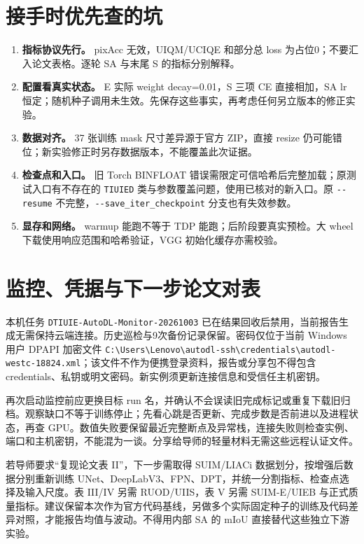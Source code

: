 \documentclass[UTF8,11pt,a4paper,fontset=windows]{ctexart}
\begin{document}
\section{接手时优先查的坑}

\begin{enumerate}
\item \textbf{指标协议先行。} pixAcc 无效，UIQM/UCIQE 和部分总 loss 为占位0；不要汇入论文表格。逐轮 SA 与末尾 S 的指标分别解释。
\item \textbf{配置看真实状态。} E 实际 weight decay=0.01，S 三项 CE 直接相加，SA lr 恒定；随机种子调用未生效。先保存这些事实，再考虑任何另立版本的修正实验。
\item \textbf{数据对齐。} 37 张训练 mask 尺寸差异源于官方 ZIP，直接 resize 仍可能错位；新实验修正时另存数据版本，不能覆盖此次证据。
\item \textbf{检查点和入口。} 旧 Torch BINFLOAT 错误需限定可信哈希后完整加载；原测试入口有不存在的 \texttt{TIUIED} 类与参数覆盖问题，使用已核对的新入口。原 \texttt{-\allowbreak{}-\allowbreak{}resume} 不完整，\texttt{-\allowbreak{}-\allowbreak{}save\_\allowbreak{}iter\_\allowbreak{}checkpoint} 分支也有失效参数。
\item \textbf{显存和网络。} warmup 能跑不等于 TDP 能跑；后阶段要真实预检。大 wheel 下载使用响应范围和哈希验证，VGG 初始化缓存亦需校验。
\end{enumerate}

\section{监控、凭据与下一步论文对表}

本机任务 \texttt{DTIUIE-\allowbreak{}AutoD\allowbreak{}L-\allowbreak{}Monitor-\allowbreak{}20\allowbreak{}261003} 已在结果回收后禁用，当前报告生成无需保持云端连接。历史巡检与9次备份记录保留。密码仅位于当前 Windows 用户 DPAPI 加密文件 \texttt{C:\allowbreak{}\textbackslash{}\allowbreak{}Users\textbackslash{}\allowbreak{}Len\allowbreak{}ovo\textbackslash{}\allowbreak{}autodl-\allowbreak{}s\allowbreak{}sh\textbackslash{}\allowbreak{}credentia\allowbreak{}ls\textbackslash{}\allowbreak{}autodl-\allowbreak{}we\allowbreak{}stc-\allowbreak{}18824.\allowbreak{}xm\allowbreak{}l}；该文件不作为便携登录资料，报告或分享包不得包含 credentials、私钥或明文密码。新实例须更新连接信息和受信任主机密钥。

再次启动监控前应更换目标 run 名，并确认不会误读旧完成标记或重复下载旧归档。观察缺口不等于训练停止；先看心跳是否更新、完成步数是否前进以及进程状态，再查 GPU。数值失败要保留最近完整断点及异常栈，连接失败则检查实例、端口和主机密钥，不能混为一谈。分享给导师的轻量材料无需这些远程认证文件。

若导师要求“复现论文表 II”，下一步需取得 SUIM/LIACi 数据划分，按增强后数据分别重新训练 UNet、DeepLabV3、FPN、DPT，并统一分割指标、检查点选择及输入尺度。表 III/IV 另需 RUOD/UIIS，表 V 另需 SUIM-E/UIEB 与正式质量指标。建议保留本次作为官方代码基线，另做多个实际固定种子的训练及代码差异对照，才能报告均值与波动。不得用内部 SA 的 mIoU 直接替代这些独立下游实验。
\end{document}
